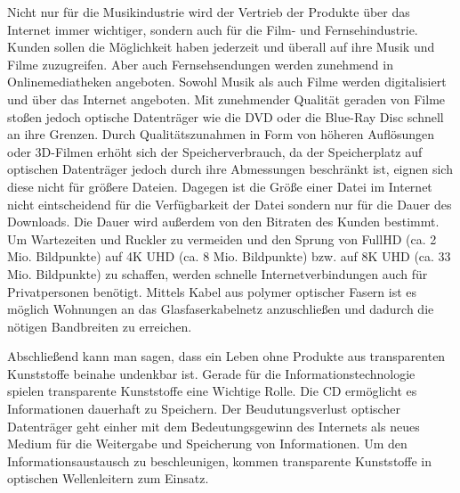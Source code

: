 Nicht nur für die Musikindustrie wird der Vertrieb der Produkte über das
Internet immer wichtiger, sondern auch für die Film- und Fernsehindustrie.
Kunden sollen die Möglichkeit haben jederzeit und überall auf ihre Musik und
Filme zuzugreifen. Aber auch Fernsehsendungen werden zunehmend in
Onlinemediatheken angeboten. Sowohl Musik als auch Filme werden digitalisiert
und über das Internet angeboten. Mit zunehmender Qualität geraden von Filme
stoßen jedoch optische Datenträger wie die DVD oder die Blue-Ray Disc schnell an
ihre Grenzen. Durch Qualitätszunahmen in Form von höheren Auflösungen oder
3D-Filmen erhöht sich der Speicherverbrauch, da der Speicherplatz auf optischen
Datenträger jedoch durch ihre Abmessungen beschränkt ist, eignen sich diese
nicht für größere Dateien. Dagegen ist die Größe einer Datei im Internet nicht
eintscheidend für die Verfügbarkeit der Datei sondern nur für die Dauer des
Downloads. Die Dauer wird außerdem von den Bitraten des Kunden bestimmt. Um
Wartezeiten und \glqq Ruckler\grqq{} zu vermeiden und den Sprung von FullHD (ca.
2 Mio. Bildpunkte) auf 4K UHD (ca. 8 Mio. Bildpunkte) bzw. auf 8K UHD (ca. 33
Mio. Bildpunkte) zu schaffen, werden schnelle Internetverbindungen auch für
Privatpersonen benötigt. Mittels Kabel aus polymer optischer Fasern ist es
möglich Wohnungen an das Glasfaserkabelnetz anzuschließen und dadurch die
nötigen Bandbreiten zu erreichen.


Abschließend kann man sagen, dass ein Leben ohne Produkte aus transparenten
Kunststoffe beinahe undenkbar ist. Gerade für die Informationstechnologie
spielen transparente Kunststoffe eine Wichtige Rolle. Die CD ermöglicht es
Informationen dauerhaft zu Speichern. Der Beudutungsverlust optischer
Datenträger geht einher mit dem Bedeutungsgewinn des Internets als neues Medium
für die Weitergabe und Speicherung von Informationen. Um den
Informationsaustausch zu beschleunigen, kommen transparente Kunststoffe in
optischen Wellenleitern zum Einsatz.

